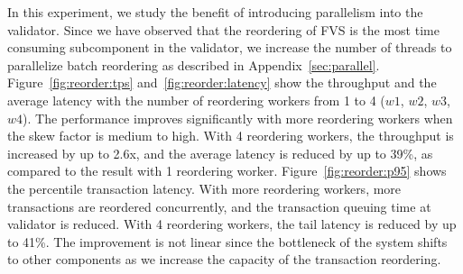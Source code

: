 In this experiment, we study the benefit of introducing parallelism into the validator. Since we have observed that the reordering of FVS is the most time consuming subcomponent in the validator, we increase the number of threads to parallelize batch reordering as described in Appendix~\ref{sec:parallel}. 
Figure~\ref{fig:reorder:tps} and~\ref{fig:reorder:latency} show the throughput
and the average latency with the number of reordering workers from 1 to 4
($w1$, $w2$, $w3$, $w4$). The performance improves significantly with more reordering workers when the skew factor is medium to high. With 4 reordering workers, the throughput is increased by up to 2.6x, and the average latency is reduced by up to 39\%, as compared to the result with 1 reordering worker. Figure~\ref{fig:reorder:p95} shows the percentile transaction latency. With more reordering workers, more transactions are reordered concurrently, and the transaction queuing time at validator is reduced. With 4 reordering workers, the tail latency is reduced by up to 41\%. The improvement is not linear since the bottleneck of the system shifts to other
components as we increase the capacity of the transaction reordering.

